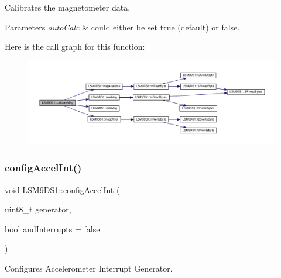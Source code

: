 Calibrates the magnetometer data. 


\begin{DoxyParams}{Parameters}
{\em auto\+Calc} & could either be set true (default) or false. \\
\hline
\end{DoxyParams}
Here is the call graph for this function\+:\nopagebreak
\begin{figure}[H]
\begin{center}
\leavevmode
\includegraphics[width=350pt]{classLSM9DS1_afb45f0bcbcbeb15d4bd1a28821b24d14_cgraph}
\end{center}
\end{figure}
\mbox{\label{classLSM9DS1_a1e8ebc6c1e3876d8936197dc93f76717}} 
\subsubsection{\texorpdfstring{config\+Accel\+Int()}{configAccelInt()}}
{\footnotesize\ttfamily void L\+S\+M9\+D\+S1\+::config\+Accel\+Int (\begin{DoxyParamCaption}\item[{uint8\+\_\+t}]{generator,  }\item[{bool}]{and\+Interrupts = {\ttfamily false} }\end{DoxyParamCaption})}



Configures Accelerometer Interrupt Generator. 


